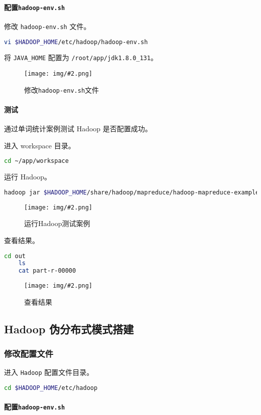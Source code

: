 \documentclass{article}
\newcommand{\img}[3][0.9]{%
    \begin{figure}[H]
        \centering
        \texttt{[image: img/\#2.png]}
        \caption{#3}
    \end{figure}
}
\newcommand{\subsubsubsection}[1]{\paragraph{#1}\mbox{}}
\begin{document}
\subsubsubsection{配置\texttt{hadoop-env.sh}}

\label{subsubsubsection:hadoop-env.sh}

修改 \texttt{hadoop-env.sh} 文件。

\begin{lstlisting}[language=bash]
    vi $HADOOP_HOME/etc/hadoop/hadoop-env.sh
\end{lstlisting}

将 \texttt{JAVA\_HOME} 配置为 \texttt{/root/app/jdk1.8.0\_131}。

\img{2.3.3.1}{修改\texttt{hadoop-env.sh}文件}

\subsubsubsection{测试}

通过单词统计案例测试 Hadoop 是否配置成功。

进入 workspace 目录。

\begin{lstlisting}[language=bash]
    cd ~/app/workspace
\end{lstlisting}

运行 Hadoop。

\begin{lstlisting}[language=bash]
    hadoop jar $HADOOP_HOME/share/hadoop/mapreduce/hadoop-mapreduce-examples-2.5.0.jar wordcount ./HelloWorld.java ./out
\end{lstlisting}

\img{2.3.4.1}{运行Hadoop测试案例}

查看结果。

\begin{lstlisting}[language=bash]
    cd out
    ls
    cat part-r-00000
\end{lstlisting}

\img{0.2.3.4.2}{查看结果}

\subsection{Hadoop 伪分布式模式搭建}

\subsubsection{修改配置文件}

进入 \texttt{Hadoop} 配置文件目录。

\begin{lstlisting}[language=bash]
    cd $HADOOP_HOME/etc/hadoop
\end{lstlisting}

\subsubsubsection{配置\texttt{hadoop-env.sh}}
\end{document}
